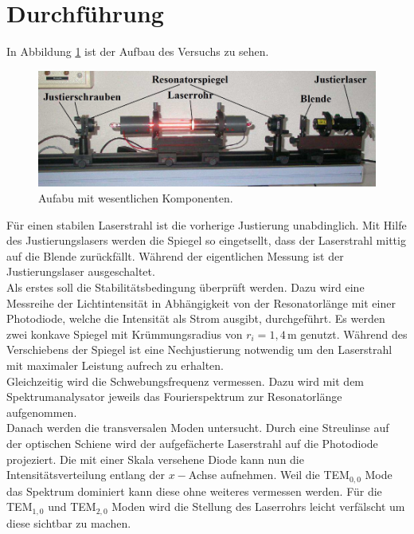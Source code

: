\section{Durchführung}
\label{sec:Durchführung}

In Abbildung \ref{fig:aufbau} ist der Aufbau des Versuchs zu sehen.

\begin{figure}
    \centering
    \includegraphics[width=\textwidth]{data/aufbau.png}
    \caption{Aufabu mit wesentlichen Komponenten.}
    \label{fig:aufbau}
\end{figure}

Für einen stabilen Laserstrahl ist die vorherige Justierung unabdinglich.
Mit Hilfe des Justierungslasers werden die Spiegel so eingetsellt, dass der Laserstrahl mittig auf die Blende zurückfällt.
Während der eigentlichen Messung ist der Justierungslaser ausgeschaltet.\\
Als erstes soll die Stabilitätsbedingung überprüft werden.
Dazu wird eine Messreihe der Lichtintensität in Abhängigkeit von der Resonatorlänge mit einer Photodiode, welche die Intensität als Strom ausgibt, durchgeführt.
Es werden zwei konkave Spiegel mit Krümmungsradius von $r_i=1,4\,$m genutzt.
Während des Verschiebens der Spiegel ist eine Nechjustierung notwendig um den Laserstrahl mit maximaler Leistung aufrech zu erhalten.\\
Gleichzeitig wird die Schwebungsfrequenz vermessen.
Dazu wird mit dem Spektrumanalysator jeweils das Fourierspektrum zur Resonatorlänge aufgenommen.\\

Danach werden die transversalen Moden untersucht.
Durch eine Streulinse auf der optischen Schiene wird der aufgefächerte Laserstrahl auf die Photodiode projeziert.
Die mit einer Skala versehene Diode kann nun die Intensitätsverteilung entlang der $x-$Achse aufnehmen.
Weil die TEM$_{0,0}$ Mode das Spektrum dominiert kann diese ohne weiteres vermessen werden.
Für die TEM$_{1,0}$ und TEM$_{2,0}$ Moden wird die Stellung des Laserrohrs leicht verfälscht um diese sichtbar zu machen.\\

